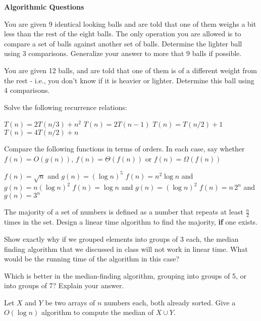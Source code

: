 \documentclass[addpoints,12pt]{exam}
\begin{document}
\begin{center}
{\Large \textbf{Algorithmic Questions}}
\end{center}


\begin{questions}
\qformat{[G\thequestion]}
\question
You are given 9 identical looking balls and are told that one of them weighs a bit less than the rest of 
the eight balls. The only operation you are allowed is to compare a set of balls against another set of 
balls. Determine the lighter ball using 3 comparisons. Generalize your answer to more that 9 balls if 
possible.

\question
You are given 12 balls, and are told that one of them is of a different weight from the rest - 
i.e., you don't know if it is heavier or lighter. Determine this ball using 4 comparisons.
\end{questions}



\begin{questions}
\qformat{[A\thequestion]}

\question
Solve the following recurrence relations:
\begin{choices}
\choice $T(n) = 2T(n/3) + n^2$ 
\choice $T(n) = 2T(n-1)$
\choice $T(n) = T(n/2) + 1$
\choice $T(n) = 4T(n/2) + n$
\end{choices}

\question
 Compare the following functions in terms of orders. In each case, say whether 
$f(n) = O(g(n))$, $f(n) = \Theta(f(n))$ or $f(n) = \Omega(f(n))$
\begin{choices}
    \choice $f(n) = \sqrt{n}$ and $g(n) = (\log n)^5$
    \choice $f(n) = n^2 \log n $ and $g(n) = n (\log n)^2$
    \choice $f(n) = \log n$ and $g(n) = (\log n)^2$
    \choice $f(n) = n \, 2^n$ and $g(n) = 3^n$
\end{choices}

\end{questions}

\begin{questions}
\qformat{[OS\thequestion]}
\question
The majority of a set of numbers is defined as a number that repeats at least $\frac{n}{2}$ times in the set. 
Design a linear time algorithm to find the majority, {\bf if} one exists.

\question
Show exactly why if we grouped elements into groups of 3 each, the median finding algorithm that 
we discussed in class will not work in linear time. What would be the running time of the algorithm in 
this case?

\question
Which is better in the median-finding algorithm, grouping into groups of 5, or into groups of 7? 
Explain your answer.

\question
Let $X$ and $Y$ be two arrays of $n$ numbers each, both already sorted. Give a $O(\log n)$ algorithm to 
compute the median of $X \cup Y$.


\end{questions}
\end{document}
